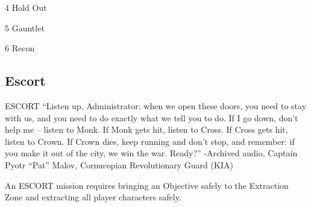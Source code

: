  4                                                      Hold Out 

 5                                                      Gauntlet 

 6                                                      Recon 


\subsection{Escort}                                          


                                                               ESCORT  
                                                               “Listen up, Administrator: when we open these  
                                                               doors, you need to stay with us, and you need to  
                                                               do exactly what we tell you to do. If I go down,  
                                                               don’t help me -- listen to Monk. If Monk gets hit,  
                                                               listen to Cross. If Cross gets hit, listen to Crown.  
                                                               If Crown dies, keep running and don’t stop, and  
                                                               remember: if you make it out of the city, we win  
                                                               the war. Ready?”   
                                                               -Archived audio, Captain Pyotr “Pat” Malov,  
                                                               Cornucopian Revolutionary Guard (KIA)  

                                                               An ESCORT mission requires bringing an  
                                                               Objective safely to the Extraction Zone and  
                                                               extracting all player characters safely.  


